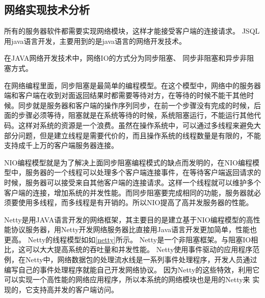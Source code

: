 \subsection{网络实现技术分析}
所有的服务器软件都需要实现网络模块，这样才能接受客户端的连接请求。
JSQL用java语言开发，主要用到的是java语言的网络开发技术。

在JAVA网络开发技术中，网络IO的方式分为同步阻塞、
同步非阻塞和异步非阻塞方式。

在网络编程里面，同步阻塞是最简单的编程模型。在这个模型中，网络中的服务器端和客户端在收到对面返回结果时都需要等待对方，在等待的时候不能干其他时候。同步就是服务器和客户端的操作序列同步，在前一个步骤没有完成的时候，后面的步骤必须等待，阻塞就是在系统等待的时候，系统阻塞运行，不能运行其他代码。这样对系统的资源是一个浪费。虽然在操作系统中，可以通过多线程来避免大部分问题，但是建立线程是需要代价的，而且操作系统的线程数量是有限的，不能支持成千上万的客户端服务器连接。

NIO编程模型就是为了解决上面同步阻塞编程模式的缺点而发明的，在NIO编程模型中，服务器的一个线程可以处理多个客户端连接事件，在等待客户端返回请求的时候，服务器可以接受来自其他客户端的连接请求。这样一个线程就可以维护多个客户端的连接，增加系统的并发性能。而同步阻塞要完成相同的功能，服务器就必须要使用多线程，而多线程是有开销的。所以NIO提高了高并发服务器的性能。



Netty是用JAVA语言开发的网络框架，其主要目的是建立基于NIO编程模型的高性能协议服务器，用Netty开发网络服务器比直接用Java语言开发更加简单，性能也更高。
Netty的线程模型如如\ref{netty}所示。
Netty是一个非阻塞框架。与阻塞IO相比，这可以大大提高系统的吞吐量和并发性能。
Netty使用事件驱动的应用程序范例，在Netty中，网络数据包的处理流水线是一系列事件处理程序，开发人员通过编写自己的事件处理程序就能自己开发网络协议。
因为Netty的这些特效，利用它可以实现一个高性能的网络应用程序，所以本系统的网络模块也是用的Netty来
实现的，它支持高并发的客户端访问。
